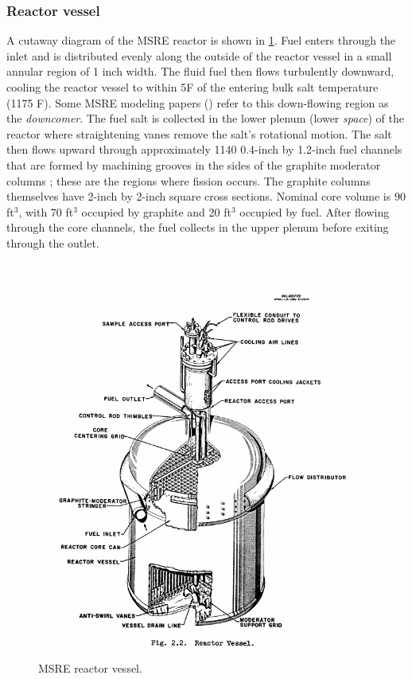 \documentclass{article}
\let\Oldsubsubsection\subsubsection
\renewcommand{\subsubsection}{\FloatBarrier\Oldsubsubsection}
\begin{document}
\subsubsection{Reactor vessel}

A cutaway diagram of the \gls{MSRE} reactor is shown in \cref{fig:MSRE_reactor}. Fuel
enters through the inlet and is distributed evenly along the outside of the
reactor vessel in a small annular region of 1 inch
width. \cite{robertson_msre_1965} The fluid fuel then flows turbulently
downward, cooling the reactor vessel to within 5\textdegree F of the entering
bulk salt temperature (1175 \textdegree F). \cite{robertson_msre_1965} Some \gls{MSRE}
modeling papers (\cite{kophazi_development_????}) refer to this down-flowing
region as the \textit{downcomer}. The fuel salt is collected in the lower plenum
(lower \textit{space}) of the reactor where straightening vanes remove the
salt's rotational motion. The salt then flows upward through approximately 1140
0.4-inch by 1.2-inch fuel channels that are formed by machining grooves in the
sides of the graphite moderator columns \cite{robertson_msre_1965}; these are the
regions where fission occurs. The graphite columns themselves have 2-inch by
2-inch square cross sections. Nominal core volume is 90 ft$^3$, with 70 ft$^3$
occupied by graphite and 20 ft$^3$ occupied by fuel. \cite{robertson_msre_1965}
After flowing through the core channels, the fuel collects in the upper plenum
before exiting through the outlet.

\begin{figure}[htpb]
  \centering
  \includegraphics[max height=.5\textheight,max width=\textwidth,keepaspectratio]{MSRE_reactor_vessel.png}
  \caption{\gls{MSRE} reactor vessel. \cite{robertson_msre_1965}}
  \label{fig:MSRE_reactor}
\end{figure}
\end{document}
